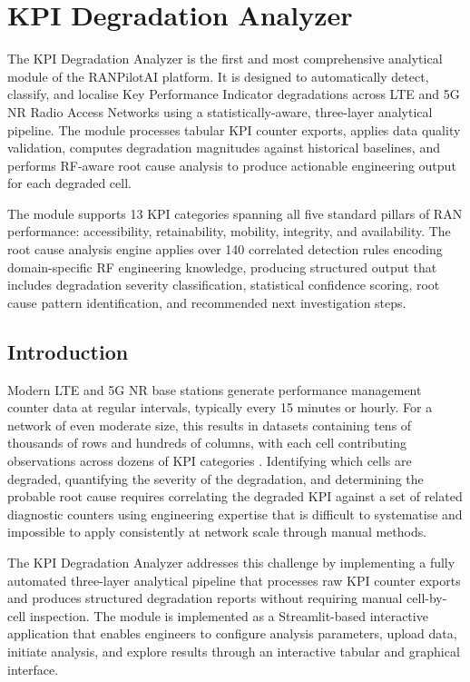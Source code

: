\chapter{KPI Degradation Analyzer}
\label{chap:kpi_degradation}

The KPI Degradation Analyzer is the first and most comprehensive analytical module of the RANPilotAI platform. It is designed to automatically detect, classify, and localise Key Performance Indicator degradations across LTE and 5G NR Radio Access Networks using a statistically-aware, three-layer analytical pipeline. The module processes tabular KPI counter exports, applies data quality validation, computes degradation magnitudes against historical baselines, and performs RF-aware root cause analysis to produce actionable engineering output for each degraded cell.

The module supports 13 KPI categories spanning all five standard pillars of RAN performance: accessibility, retainability, mobility, integrity, and availability. The root cause analysis engine applies over 140 correlated detection rules encoding domain-specific RF engineering knowledge, producing structured output that includes degradation severity classification, statistical confidence scoring, root cause pattern identification, and recommended next investigation steps.

\section{Introduction}

Modern LTE and 5G NR base stations generate performance management counter data at regular intervals, typically every 15 minutes or hourly. For a network of even moderate size, this results in datasets containing tens of thousands of rows and hundreds of columns, with each cell contributing observations across dozens of KPI categories \cite{holma2011}. Identifying which cells are degraded, quantifying the severity of the degradation, and determining the probable root cause requires correlating the degraded KPI against a set of related diagnostic counters using engineering expertise that is difficult to systematise and impossible to apply consistently at network scale through manual methods.

The KPI Degradation Analyzer addresses this challenge by implementing a fully automated three-layer analytical pipeline that processes raw KPI counter exports and produces structured degradation reports without requiring manual cell-by-cell inspection. The module is implemented as a Streamlit-based interactive application that enables engineers to configure analysis parameters, upload data, initiate analysis, and explore results through an interactive tabular and graphical interface.


